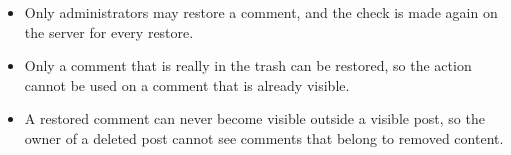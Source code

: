 \begin{itemize}[leftmargin=1.6em,topsep=4pt,itemsep=3pt,parsep=0pt,label=$\bullet$]
        \begin{itemize}[leftmargin=2.2em,topsep=2pt,itemsep=3pt,parsep=0pt,label=$\circ$]
            \item Only administrators may restore a comment, and the check is made again on the server for every restore.
            \item Only a comment that is really in the trash can be restored, so the action cannot be used on a comment that is already visible.
            \item A restored comment can never become visible outside a visible post, so the owner of a deleted post cannot see comments that belong to removed content.
        \end{itemize}
\end{itemize}
